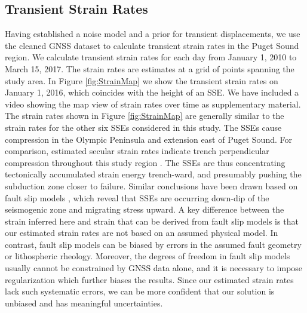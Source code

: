 \documentclass[extra,mreferee]{gji}
\begin{document}
\subsection{Transient Strain Rates}\label{sec:Results} 
Having established a noise model and a prior for transient displacements, we use the cleaned GNSS dataset to calculate transient strain rates in the Puget Sound region.  We calculate transient strain rates for each day from January 1, 2010 to March 15, 2017. The strain rates are estimates at a grid of points spanning the study area. In Figure \ref{fig:StrainMap} we show the transient strain rates on January 1, 2016, which coincides with the height of an SSE. We have included a video showing the map view of strain rates over time as supplementary material. The strain rates shown in Figure \ref{fig:StrainMap} are generally similar to the strain rates for the other six SSEs considered in this study. The SSEs cause compression in the Olympic Peninsula and extension east of Puget Sound. For comparison, estimated secular strain rates indicate trench perpendicular compression throughout this study region \citep{Murray2000,McCaffrey2007,McCaffrey2013}. The SSEs are thus concentrating tectonically accumulated strain energy trench-ward, and presumably pushing the subduction zone closer to failure. Similar conclusions have been drawn based on fault slip models \citep[e.g.,][]{Dragert2001,Wech2009,Schmidt2010}, which reveal that SSEs are occurring down-dip of the seismogenic zone and migrating stress upward. A key difference between the strain inferred here and strain that can be derived from fault slip models is that our estimated strain rates are not based on an assumed physical model. In contrast, fault slip models can be biased by errors in the assumed fault geometry or lithospheric rheology. Moreover, the degrees of freedom in fault slip models usually cannot be constrained by GNSS data alone, and it is necessary to impose regularization which further biases the results. Since our estimated strain rates lack such systematic errors, we can be more confident that our solution is unbiased and has meaningful uncertainties.  
\end{document}
